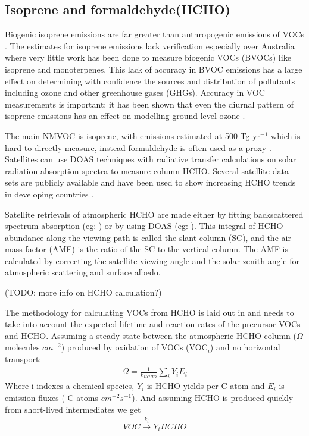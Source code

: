 \subsection{Isoprene and formaldehyde(HCHO)}

Biogenic isoprene emissions are far greater than anthropogenic emissions of VOCs \cite{Guenther_2006}. 
The estimates for isoprene emissions lack verification especially over Australia where very little work has been done to measure biogenic VOCs (BVOCs) like isoprene and monoterpenes.
This lack of accuracy in BVOC emissions has a large effect on determining with confidence the sources and distribution of pollutants including ozone and other greenhouse gases (GHGs).
Accuracy in VOC measurements is important: it has been shown that even the diurnal pattern of isoprene emissions has an effect on modelling ground level ozone \cite{Hewitt_2011}.

The main NMVOC is isoprene, with emissions estimated at 500 Tg yr$^{-1}$ \cite{Guenther_2006} which is hard to directly measure, instead formaldehyde is often used as a proxy \cite{Marais_2012,bauwens2013satellite}.
Satellites can use DOAS techniques with radiative transfer calculations on solar radiation absorption spectra to measure column HCHO.
Several satellite data sets are publicly available and have been used to show increasing HCHO trends in developing countries \cite{Mahajan_2015}.

Satellite retrievals of atmospheric HCHO are made either by fitting backscattered spectrum absorption (eg: \citet{Chance_2000}) or by using DOAS (eg: \citet{leue_2001}).
This integral of HCHO abundance along the viewing path is called the slant column (SC), and the air mass factor (AMF) is the ratio of the SC to the vertical column.
The AMF is calculated by correcting the satellite viewing angle and the solar zenith angle for atmospheric scattering and surface albedo.

(TODO: more info on HCHO calculation?)

The methodology for calculating VOCs from HCHO is laid out in \citet{Palmer_2003} and needs to take into account the expected lifetime and reaction rates of the precursor VOCs and HCHO.
Assuming a steady state between the atmospheric HCHO column ($\Omega$ molecules $cm^{-2}$)  produced by oxidation of VOCs (VOC$_i$) and no horizontal transport:
\begin{eqnarray*}
\Omega = \frac{1}{k_{HCHO}} \sum_{i} Y_i E_i
\end{eqnarray*}
Where i indexes a chemical species, $Y_i$ is HCHO yields per C atom and $E_i$ is emission fluxes ( C atoms $cm^{-2}s^{-1}$).
And assuming HCHO is produced quickly from short-lived intermediates we get
\begin{eqnarray*}
VOC \overset{k_i}{\rightarrow} Y_i HCHO
\end{eqnarray*}

